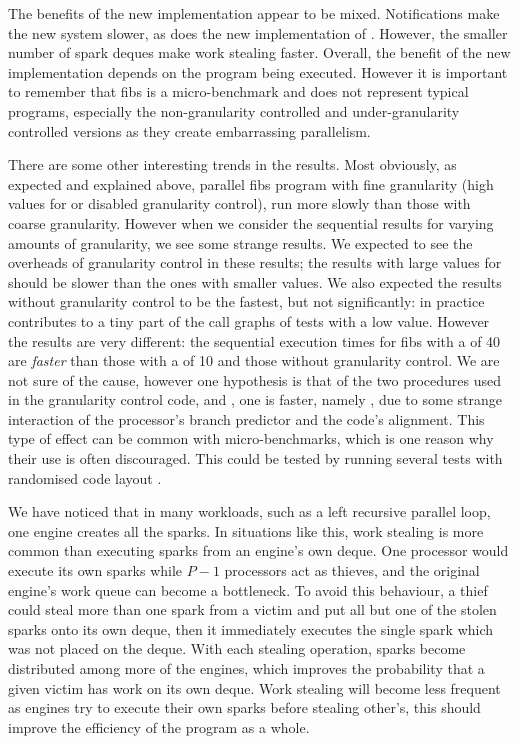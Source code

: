 The benefits of the new implementation appear to be mixed.
Notifications make the new system slower,
as does the new implementation of \joinandcontinue.
However,
the smaller number of spark deques make work stealing faster.
Overall,
the benefit of the new implementation depends on the program being executed.
However it is important to remember that fibs is a micro-benchmark and does
not represent typical programs,
especially the non-granularity controlled and under-granularity controlled
versions as they create embarrassing parallelism.

There are some other interesting trends in the results.
Most obviously,
as expected and explained above,
parallel fibs program with fine granularity
(high values for \Depth or disabled granularity control),
run more slowly than those with coarse granularity.
However
when we consider the sequential results for varying amounts of granularity,
we see some strange results.
We expected to see the overheads of granularity control in these
results;
the results with large values for \Depth should be slower than the ones with
smaller values.
We also expected the results without granularity control to be the fastest,
but not significantly:
in practice \fibsgc contributes to a tiny part of the call graphs of tests
with a low \Depth value.
However the results are very different:
the sequential execution times for fibs with a \Depth of 40
are \emph{faster} than those with a \Depth of 10
and those without granularity control.
We are not sure of the cause,
however one hypothesis is that of the two procedures used in the granularity
control code,
\fibsseq and \fibsgc,
one is faster, namely \fibsgc, due to
some strange interaction of the processor's branch predictor and the code's
alignment.
This type of effect can be common with micro-benchmarks,
which is one reason why their use is often discouraged.
This could be tested by running several tests with randomised code layout
\citep{curtsinger:2012:stabilizer}.

We have noticed that in many workloads,
such as a left recursive parallel loop,
one engine creates all the sparks.
In situations like this,
work stealing is more common than executing sparks from an engine's own
deque.
One processor would execute its own sparks while $P - 1$ processors act as
thieves,
and the original engine's work queue can become a bottleneck.
To avoid this behaviour,
a thief could steal more than one spark from a victim and put all but one of
the stolen sparks
onto its own deque, then it immediately executes the single spark which was
not placed on the deque.
With each stealing operation,
sparks become distributed among more of the engines,
which improves the probability that a given victim has work on its own deque.
Work stealing will become less frequent as engines try to execute their own
sparks before stealing other's,
this should improve the efficiency of the program as a whole.

